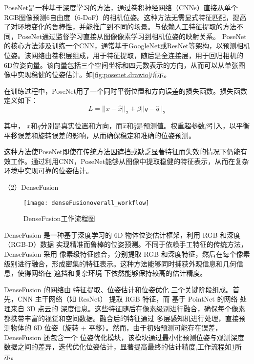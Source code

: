 PoseNet\cite{kendall2015posenet}是一种基于深度学习的方法，通过卷积神经网络（CNNs）直接从单个RGB图像预测6自由度（6-DoF）的相机位姿。这种方法无需显式特征匹配，提高了对环境变化的鲁棒性，并能推广到不同的场景。与依赖人工特征提取的方法不同，PoseNet通过监督学习直接从图像像素学习到相机位姿的映射关系。
PoseNet的核心方法涉及训练一个CNN，通常基于GoogleNet\cite{szegedy2015going}或ResNet\cite{he2016deep}等架构，以预测相机位姿。该网络由卷积层组成，用于特征提取，随后是全连接层，用于回归相机的6D位姿向量。该向量包括三个空间坐标和四元数表示的方向，从而可以从单张图像中实现稳健的位姿估计。如\cref{fig:posenet.drawio}所示。

在训练过程中，PoseNet用了一个同时平衡位置和方向误差的损失函数。损失函数定义如下：
\begin{equation}
	\label{equ:poseNet}
	L = || x - \hat{x} ||_{2} + \beta||q - \hat{q}||_{2}
\end{equation}

其中， $x$和$q$分别是真实位置和方向，而$\hat{x}$和$\hat{q}$是预测值。权重超参数$\beta$引入，以平衡平移误差和旋转误差的影响，从而确保稳定和准确的位姿预测。

这种方法使PoseNet即使在传统方法因遮挡或缺乏显著特征而失效的情况下仍能有效工作。通过利用CNN，PoseNet能够从图像中提取稳健的特征表示，从而在复杂环境中实现可靠的位姿估计。

 
 \noindent
 （2）DenseFusion
 
  \begin{figure}[htb]
 	\texttt{[image: denseFusionoverall\_workflow]}
 	\caption[DenseFusion工作流程图]{DenseFusion工作流程图} %
 	\label{fig:denseFusionoverall_workflow}
 \end{figure}
 
DenseFusion\cite{wang2019densefusion} 是一种基于深度学习的 6D 物体位姿估计框架，利用 RGB 和深度（RGB-D）数据 实现精准而鲁棒的位姿预测。不同于依赖手工特征的传统方法，DenseFusion 采用 像素级特征融合，分别提取 RGB 和深度特征，然后在每个像素级别进行融合，形成密集的特征表示。这种方法能够同时捕获外观信息和几何信息，使得网络在 遮挡和复杂环境 下依然能够保持较高的估计精度。

DenseFusion 的网络由 特征提取、位姿估计和位姿优化 三个关键阶段组成。首先，CNN 主干网络（如 ResNet） 提取 RGB 特征，而 基于 PointNet\cite{qi2017pointnet} 的网络 处理来自 3D 点云的 深度信息。这些特征随后在像素级别进行融合，确保每个像素都携带丰富的视觉和空间数据。融合后的特征通过 多层感知机进行处理，直接预测物体的 6D 位姿（旋转 + 平移）。然而，由于初始预测可能存在误差，DenseFusion 还包含一个 位姿优化模块，该模块通过最小化预测位姿与观测深度数据之间的差异，迭代优化位姿估计，显著提高最终的估计精度,工作流程如\cref{fig:denseFusionoverall_workflow}所示。

